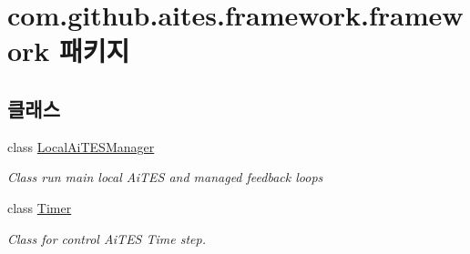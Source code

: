 \hypertarget{namespacecom_1_1github_1_1aites_1_1framework_1_1framework}{}\section{com.\+github.\+aites.\+framework.\+framework 패키지}
\label{namespacecom_1_1github_1_1aites_1_1framework_1_1framework}
\subsection*{클래스}
\begin{DoxyCompactItemize}
\item 
class \mbox{\hyperlink{classcom_1_1github_1_1aites_1_1framework_1_1framework_1_1_local_ai_t_e_s_manager}{Local\+Ai\+T\+E\+S\+Manager}}
\begin{DoxyCompactList}\small\item\em Class run main local Ai\+T\+ES and managed feedback loops \end{DoxyCompactList}\item 
class \mbox{\hyperlink{classcom_1_1github_1_1aites_1_1framework_1_1framework_1_1_timer}{Timer}}
\begin{DoxyCompactList}\small\item\em Class for control Ai\+T\+ES Time step. \end{DoxyCompactList}\end{DoxyCompactItemize}
